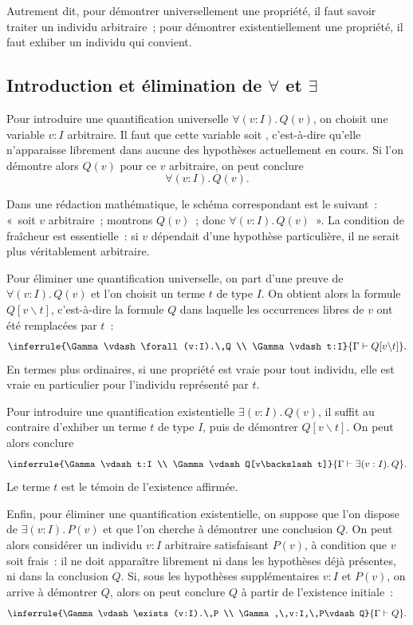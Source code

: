 Autrement dit, pour démontrer universellement une propriété, il faut
savoir traiter un individu arbitraire ; pour démontrer existentiellement
une propriété, il faut exhiber un individu qui convient.

\subsection{Introduction et élimination de $\forall$ et $\exists$}

\thingy
Pour introduire une quantification universelle
$\forall (v:I).\,Q(v)$, on choisit une variable $v:I$ arbitraire.  Il
faut que cette variable soit , c'est-à-dire qu'elle
n'apparaisse librement dans aucune des hypothèses actuellement en cours.
Si l'on démontre alors $Q(v)$ pour ce $v$ arbitraire, on peut conclure
\[
\forall (v:I).\,Q(v).
\]

Dans une rédaction mathématique, le schéma correspondant est le
suivant : « soit $v$ arbitraire ; montrons $Q(v)$ ; donc
$\forall (v:I).\,Q(v)$ ».  La condition de fraîcheur est essentielle :
si $v$ dépendait d'une hypothèse particulière, il ne serait plus
véritablement arbitraire.

\thingy
Pour éliminer une quantification universelle, on part d'une preuve de
$\forall (v:I).\,Q(v)$ et l'on choisit un terme $t$ de type $I$.  On
obtient alors la formule $Q[v\backslash t]$, c'est-à-dire la formule
$Q$ dans laquelle les occurrences libres de $v$ ont été remplacées par
$t$ :
\[
\inferrule
  {\Gamma\vdash \forall (v:I).\,Q
   \\
   \Gamma\vdash t:I}
  {\Gamma\vdash Q[v\backslash t]}.
\]
En termes plus ordinaires, si une propriété est vraie pour tout
individu, elle est vraie en particulier pour l'individu représenté par
$t$.

\thingy
Pour introduire une quantification existentielle
$\exists (v:I).\,Q(v)$, il suffit au contraire d'exhiber un terme $t$
de type $I$, puis de démontrer $Q[v\backslash t]$.  On peut alors
conclure
\[
\inferrule
  {\Gamma\vdash t:I
   \\
   \Gamma\vdash Q[v\backslash t]}
  {\Gamma\vdash \exists (v:I).\,Q}.
\]
Le terme $t$ est le témoin de l'existence affirmée.

\thingy
Enfin, pour éliminer une quantification existentielle, on suppose que
l'on dispose de $\exists (v:I).\,P(v)$ et que l'on cherche à démontrer
une conclusion $Q$.  On peut alors considérer un individu $v:I$
arbitraire satisfaisant $P(v)$, à condition que $v$ soit frais : il ne
doit apparaître librement ni dans les hypothèses déjà présentes, ni
dans la conclusion $Q$.  Si, sous les hypothèses supplémentaires
$v:I$ et $P(v)$, on arrive à démontrer $Q$, alors on peut conclure $Q$
à partir de l'existence initiale :
\[
\inferrule
  {\Gamma\vdash \exists (v:I).\,P
   \\
   \Gamma,\,v:I,\,P\vdash Q}
  {\Gamma\vdash Q}.
\]


